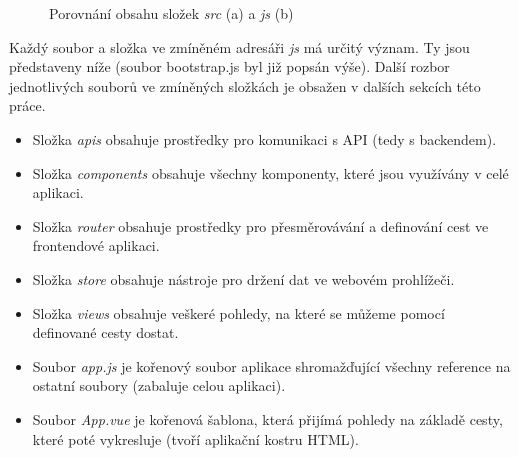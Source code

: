 	\begin{figure}[h]
		\centering
		\qquad
		\caption{Porovnání obsahu složek \textit{src} (a) a \textit{js} (b)}
		\label{fig:zdroj_kod_vue_rozdily}
	\end{figure}

	Každý soubor a složka ve zmíněném adresáři \textit{js} má určitý význam. Ty jsou představeny níže (soubor bootstrap.js byl již popsán výše). Další rozbor jednotlivých souborů ve zmíněných složkách je obsažen v dalších sekcích této práce.
	\begin{itemize}
		\item Složka \textit{apis} obsahuje prostředky pro komunikaci s API (tedy s backendem).
		\item Složka \textit{components} obsahuje všechny komponenty, které jsou využívány v celé aplikaci.
		\item Složka \textit{router} obsahuje prostředky pro přesměrovávání a definování cest ve frontendové aplikaci.
		\item Složka \textit{store} obsahuje nástroje pro držení dat ve webovém prohlížeči.
		\item Složka \textit{views} obsahuje veškeré pohledy, na které se můžeme pomocí definované cesty dostat.
		\item Soubor \textit{app.js} je kořenový soubor aplikace shromažďující všechny reference na ostatní soubory (zabaluje celou aplikaci).
		\item Soubor \textit{App.vue} je kořenová šablona, která přijímá pohledy na základě cesty, které poté vykresluje (tvoří aplikační kostru HTML).
	\end{itemize}

